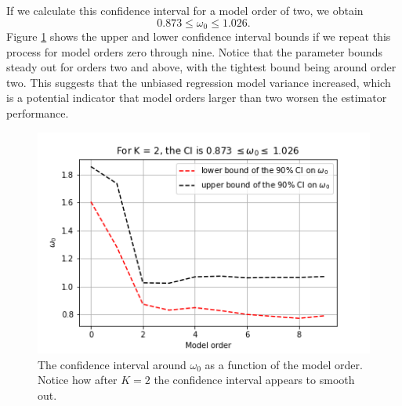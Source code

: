 \documentclass{article}
\begin{document}
If we calculate this confidence interval for a model order of two, we obtain 
\begin{equation}
    0.873 \leq \omega_0 \leq 1.026.
\end{equation}
Figure \ref{fig:Q2a_3} shows the upper and lower confidence interval bounds if we repeat this process for model orders zero through nine. Notice that the parameter bounds steady out for orders two and above, with the tightest bound being around order two. This suggests that the unbiased regression model variance increased, which is a potential indicator that model orders larger than two worsen the estimator performance.
\begin{figure}
    \centering
    \includegraphics[scale = 0.5]{Q2a_fig4.png}
    \caption{The confidence interval around $\omega_0$ as a function of the model order. Notice how after $K=2$ the confidence interval appears to smooth out.}
    \label{fig:Q2a_3}
\end{figure}
\end{document}
